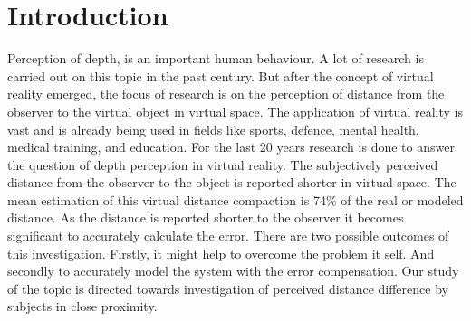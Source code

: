 \chapter{Introduction}
\label{sec:introduction}
Perception of depth, is an important human behaviour. A lot of research is carried out on this topic in the past century. But after the concept of virtual reality emerged, the focus of research is on the perception of distance from the observer to the virtual object in virtual space. The application of virtual reality is vast and is already being used in fields like sports, defence, mental health, medical training, and education. 
For the last 20 years research is done to answer the question of depth perception in virtual reality. The subjectively perceived distance from the observer to the object is reported shorter in virtual space. The mean estimation of this virtual distance compaction is 74\% of the real or modeled distance\cite{Renner:2013:PED:2543581.2543590}. As the distance is reported shorter to the observer it becomes significant to accurately calculate the error. There are two possible outcomes of this investigation. Firstly, it might help to overcome the problem it self. And secondly to accurately model the system with the error compensation. Our study of the topic is directed towards investigation of perceived distance difference by subjects in close proximity.           



